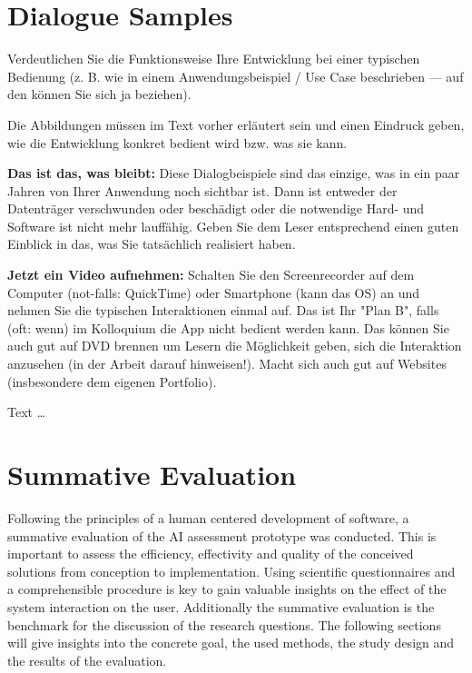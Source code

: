 \documentclass[11pt,a4paper,english]{scrreprt}
\newenvironment{comment}
  {\par\medskip
   \begingroup\color{olive}%
   }
 {\endgroup
  \medskip}
\begin{document}
\chapter{Dialogue Samples}\label{chapter:dialogue_samples}
\begin{comment}
Verdeutlichen Sie die Funktionsweise Ihre Entwicklung bei einer typischen Bedienung (z. B. wie in einem Anwendungsbeispiel / Use Case beschrieben — auf den können Sie sich ja beziehen).

Die Abbildungen müssen im Text vorher erläutert sein und einen Eindruck geben, wie die Entwicklung konkret bedient wird bzw. was sie kann.

\textbf{Das ist das, was bleibt:} Diese Dialogbeispiele sind das einzige, was in ein paar Jahren von Ihrer Anwendung noch sichtbar ist. Dann ist entweder der Datenträger verschwunden oder beschädigt oder die notwendige Hard- und Software ist nicht mehr lauffähig. Geben Sie dem Leser entsprechend einen guten Einblick in das, was Sie tatsächlich realisiert haben.

\textbf{Jetzt ein Video aufnehmen:} Schalten Sie den Screenrecorder auf dem Computer (not-falls: QuickTime) oder Smartphone (kann das OS) an und nehmen Sie die typischen Interaktionen einmal auf. Das ist Ihr "Plan B", falls (oft: wenn) im Kolloquium die App nicht bedient werden kann. Das können Sie auch gut auf DVD brennen um Lesern die Möglichkeit geben, sich die Interaktion anzusehen (in der Arbeit darauf hinweisen!). Macht sich auch gut auf Websites (insbesondere dem eigenen Portfolio).
\end{comment}

Text \dots

\newpage
\chapter{Summative Evaluation}\label{chapter:evaluation}
Following the principles of a human centered development of software, a summative evaluation of the AI assessment prototype was conducted. This is important to assess the efficiency, effectivity and quality of the conceived solutions from conception to implementation. Using scientific questionnaires and a comprehensible procedure is key to gain valuable insights on the effect of the system interaction on the user. Additionally the summative evaluation is the benchmark for the discussion of the research questions. The following sections will give insights into the concrete goal, the used methods, the study design and the results of the evaluation.
\end{document}
